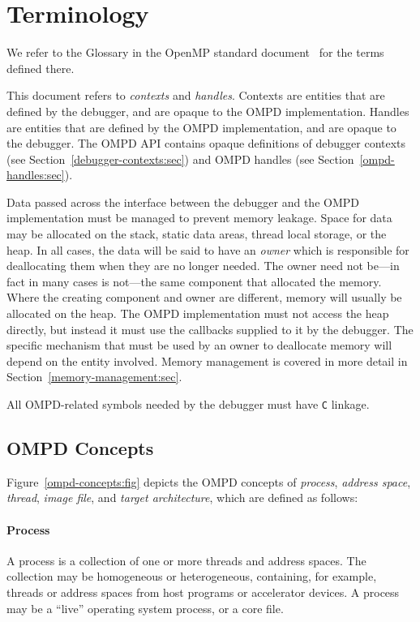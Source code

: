 \section{Terminology}

We refer to the Glossary in the OpenMP standard document~\cite{OpenMP} for the
terms defined there.

This document refers to \emph{contexts} and \emph{handles}.
Contexts are entities that are defined by the debugger, and are opaque
to the OMPD implementation.
Handles are entities that are defined by the OMPD implementation, and
are opaque to the debugger.
The OMPD API contains opaque definitions of debugger contexts
(see Section~\ref{debugger-contexts:sec}) and OMPD handles
(see Section~\ref{ompd-handles:sec}).

Data passed across the interface between the debugger and the
OMPD implementation must be managed to prevent memory leakage.
Space for data may be allocated on the stack, static data areas,
thread local storage, or the heap.
In all cases, the data will be said to have an \emph{owner}
which is responsible for deallocating them when they are
no longer needed.
The owner need not be---in fact in many cases is not---the same component
that allocated the memory.
Where the creating component and owner are different, memory will
usually be allocated on the heap.
The OMPD implementation must not access the heap directly,
but instead it must use the callbacks supplied to it by the debugger.
The specific mechanism that must be used by an owner to deallocate memory will
depend on the entity involved.
Memory management is covered in more detail in
Section~\ref{memory-management:sec}.

All OMPD-related symbols needed by the debugger must have \texttt{C} linkage.

\subsection{OMPD Concepts}
\label{ompd-concepts:sec}

Figure~\ref{ompd-concepts:fig} depicts the OMPD concepts of
\emph{process}, \emph{address space}, \emph{thread}, \emph{image
file}, and \emph{target architecture}, which are defined as follows:

\paragraph{Process}
A process is a collection of one or more threads and address spaces.
The collection may be homogeneous or heterogeneous, containing,
for example, threads or address spaces from host programs or
accelerator devices.
A process may be a ``live'' operating system process,
or a core file.

